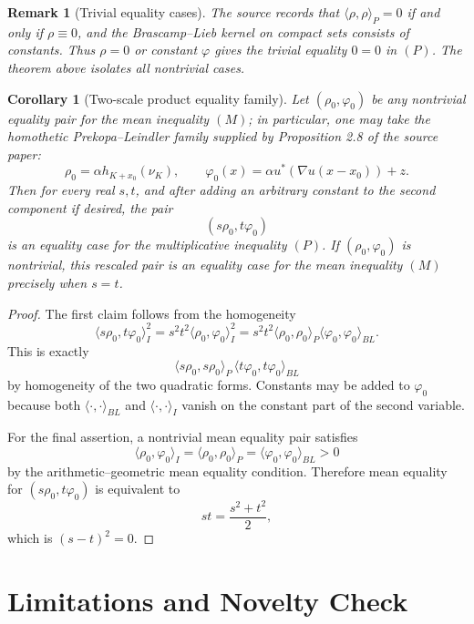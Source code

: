 \documentclass[11pt]{article}
\newtheorem{corollary}{Corollary}
\newtheorem{remark}{Remark}
\begin{document}
\begin{remark}[Trivial equality cases]
The source records that \(\langle\rho,\rho\rangle_P=0\) if and only if
\(\rho\equiv0\), and the Brascamp--Lieb kernel on compact sets consists of
constants.  Thus \(\rho=0\) or constant \(\varphi\) gives the trivial equality
\(0=0\) in \((P)\).  The theorem above isolates all nontrivial cases.
\end{remark}

\begin{corollary}[Two-scale product equality family]
Let \((\rho_0,\varphi_0)\) be any nontrivial equality pair for the mean
inequality \((M)\); in particular, one may take the homothetic
Prekopa--Leindler family supplied by Proposition 2.8 of the source paper:
\[
  \rho_0=\alpha h_{K+x_0}(\nu_K),\qquad
  \varphi_0(x)=\alpha u^*(\nabla u(x-x_0))+z .
\]
Then for every real \(s,t\), and after adding an arbitrary constant to the
second component if desired, the pair
\[
  (s\rho_0,t\varphi_0)
\]
is an equality case for the multiplicative inequality \((P)\).  If
\((\rho_0,\varphi_0)\) is nontrivial, this rescaled pair is an equality case
for the mean inequality \((M)\) precisely when \(s=t\).
\end{corollary}

\begin{proof}
The first claim follows from the homogeneity
\[
\langle s\rho_0,t\varphi_0\rangle_I^2
=s^2t^2\langle\rho_0,\varphi_0\rangle_I^2
=s^2t^2
\langle\rho_0,\rho_0\rangle_P
\langle\varphi_0,\varphi_0\rangle_{BL}.
\]
This is exactly
\[
\langle s\rho_0,s\rho_0\rangle_P
\,
\langle t\varphi_0,t\varphi_0\rangle_{BL}
\]
by homogeneity of the two quadratic forms.  Constants may be added to
\(\varphi_0\) because both
\(\langle\cdot,\cdot\rangle_{BL}\) and \(\langle\cdot,\cdot\rangle_I\) vanish
on the constant part of the second variable.

For the final assertion, a nontrivial mean equality pair satisfies
\[
\langle\rho_0,\varphi_0\rangle_I
=
\langle\rho_0,\rho_0\rangle_P
=
\langle\varphi_0,\varphi_0\rangle_{BL}>0
\]
by the arithmetic--geometric mean equality condition.  Therefore mean equality
for \((s\rho_0,t\varphi_0)\) is equivalent to
\[
  st=\frac{s^2+t^2}{2},
\]
which is \((s-t)^2=0\).
\end{proof}

\section*{Limitations and Novelty Check}
\end{document}
